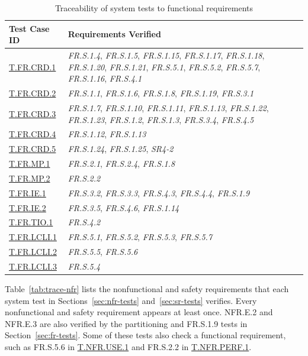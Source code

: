 \documentclass[12pt, titlepage]{article}
\begin{document}
\begin{table}[htbp]
\centering
\caption{Traceability of system tests to functional requirements}
\label{tab:trace-fr}
\begin{tabularx}{\textwidth}{lX}
\toprule
\textbf{Test Case ID} & \textbf{Requirements Verified} \\
\midrule
\hyperref[T.FR.CRD.1]{T.FR.CRD.1} & \textit{FR.S.1.4}, \textit{FR.S.1.5}, \textit{FR.S.1.15},
		\textit{FR.S.1.17}, \textit{FR.S.1.18}, \textit{FR.S.1.20}, \textit{FR.S.1.21},
		\textit{FR.S.5.1}, \textit{FR.S.5.2}, \textit{FR.S.5.7}, \textit{FR.S.1.16}, \textit{FR.S.4.1} \\
\hyperref[T.FR.CRD.2]{T.FR.CRD.2} & \textit{FR.S.1.1}, \textit{FR.S.1.6}, \textit{FR.S.1.8},
		\textit{FR.S.1.19}, \textit{FR.S.3.1} \\
\hyperref[T.FR.CRD.3]{T.FR.CRD.3} & \textit{FR.S.1.7}, \textit{FR.S.1.10}, \textit{FR.S.1.11},
		\textit{FR.S.1.13}, \textit{FR.S.1.22}, \textit{FR.S.1.23}, \textit{FR.S.1.2},
		\textit{FR.S.1.3}, \textit{FR.S.3.4}, \textit{FR.S.4.5} \\
\hyperref[T.FR.CRD.4]{T.FR.CRD.4} & \textit{FR.S.1.12}, \textit{FR.S.1.13} \\
\hyperref[T.FR.CRD.5]{T.FR.CRD.5} & \textit{FR.S.1.24}, \textit{FR.S.1.25}, \textit{SR4-2} \\
\hyperref[T.FR.MP.1]{T.FR.MP.1} & \textit{FR.S.2.1}, \textit{FR.S.2.4}, \textit{FR.S.1.8} \\
\hyperref[T.FR.MP.2]{T.FR.MP.2} & \textit{FR.S.2.2} \\
\hyperref[T.FR.IE.1]{T.FR.IE.1} & \textit{FR.S.3.2}, \textit{FR.S.3.3}, \textit{FR.S.4.3}, \textit{FR.S.4.4},
		\textit{FR.S.1.9} \\
\hyperref[T.FR.IE.2]{T.FR.IE.2} & \textit{FR.S.3.5}, \textit{FR.S.4.6}, \textit{FR.S.1.14} \\
\hyperref[T.FR.TIO.1]{T.FR.TIO.1} & \textit{FR.S.4.2} \\
\hyperref[T.FR.LCLI.1]{T.FR.LCLI.1} & \textit{FR.S.5.1}, \textit{FR.S.5.2}, \textit{FR.S.5.3}, \textit{FR.S.5.7} \\
\hyperref[T.FR.LCLI.2]{T.FR.LCLI.2} & \textit{FR.S.5.5}, \textit{FR.S.5.6} \\
\hyperref[T.FR.LCLI.3]{T.FR.LCLI.3} & \textit{FR.S.5.4} \\
\bottomrule
\end{tabularx}
\end{table}

Table~\ref{tab:trace-nfr} lists the nonfunctional and safety requirements
that each system test in Sections~\ref{sec:nfr-tests} and~\ref{sec:sr-tests}
verifies. Every nonfunctional and safety
requirement appears at least once. NFR.E.2 and NFR.E.3 are also verified by
the partitioning and FR.S.1.9 tests in Section~\ref{sec:fr-tests}. Some of
these tests also check a functional requirement, such as FR.S.5.6 in
\hyperref[T.NFR.USE.1]{T.NFR.USE.1} and FR.S.2.2 in
\hyperref[T.NFR.PERF.1]{T.NFR.PERF.1}.
\end{document}

